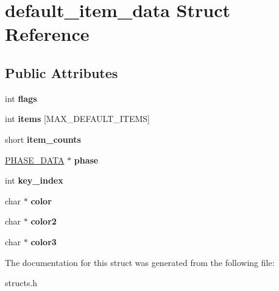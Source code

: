 \hypertarget{structdefault__item__data}{\section{default\-\_\-item\-\_\-data Struct Reference}
\label{structdefault__item__data}
}
\subsection*{Public Attributes}
\begin{DoxyCompactItemize}
\item 
\hypertarget{structdefault__item__data_a369de5226a234457768cb7a5f7b5bc6d}{int {\bfseries flags}}\label{structdefault__item__data_a369de5226a234457768cb7a5f7b5bc6d}

\item 
\hypertarget{structdefault__item__data_afca11eefdd1f0b777d97779af6e6833e}{int {\bfseries items} \mbox{[}M\-A\-X\-\_\-\-D\-E\-F\-A\-U\-L\-T\-\_\-\-I\-T\-E\-M\-S\mbox{]}}\label{structdefault__item__data_afca11eefdd1f0b777d97779af6e6833e}

\item 
\hypertarget{structdefault__item__data_a1e897ccb87583497982d1cba47357dc8}{short {\bfseries item\-\_\-counts}}\label{structdefault__item__data_a1e897ccb87583497982d1cba47357dc8}

\item 
\hypertarget{structdefault__item__data_aa3a491014b7b0fc299471f65ac37b6f8}{\hyperlink{structphase__data}{P\-H\-A\-S\-E\-\_\-\-D\-A\-T\-A} $\ast$ {\bfseries phase}}\label{structdefault__item__data_aa3a491014b7b0fc299471f65ac37b6f8}

\item 
\hypertarget{structdefault__item__data_aa7cbd63e2bbe2ef79c29af90a3911fcb}{int {\bfseries key\-\_\-index}}\label{structdefault__item__data_aa7cbd63e2bbe2ef79c29af90a3911fcb}

\item 
\hypertarget{structdefault__item__data_a8a4976de1df5d41c62b120f391d82028}{char $\ast$ {\bfseries color}}\label{structdefault__item__data_a8a4976de1df5d41c62b120f391d82028}

\item 
\hypertarget{structdefault__item__data_af96b27b213067d107137204932670608}{char $\ast$ {\bfseries color2}}\label{structdefault__item__data_af96b27b213067d107137204932670608}

\item 
\hypertarget{structdefault__item__data_a32078627948216bce76bd7ac4375eb78}{char $\ast$ {\bfseries color3}}\label{structdefault__item__data_a32078627948216bce76bd7ac4375eb78}

\end{DoxyCompactItemize}


The documentation for this struct was generated from the following file\-:\begin{DoxyCompactItemize}
\item 
structs.\-h\end{DoxyCompactItemize}

